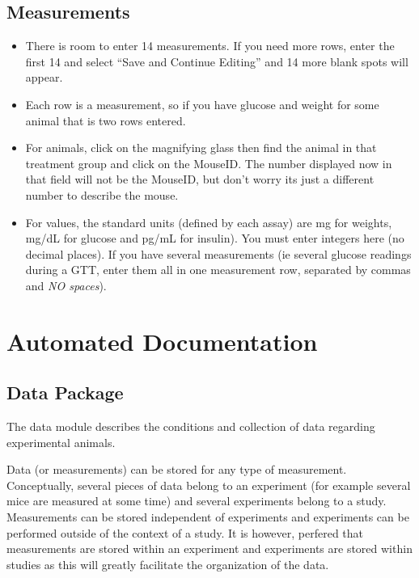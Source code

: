 \documentclass[letterpaper,10pt,english]{sphinxmanual}
\begin{document}
\section{Measurements}
\label{usage:measurements}\begin{itemize}
\item {} 
There is room to enter 14 measurements.  If you need more rows, enter the first 14 and select ``Save and Continue Editing'' and 14 more blank spots will appear.


\item {} 
Each row is a measurement, so if you have glucose and weight for some animal that is two rows entered.


\item {} 
For animals, click on the magnifying glass then find the animal in that treatment group and click on the MouseID. The number displayed now in that field will not be the MouseID, but don't worry its just a different number to describe the mouse.


\item {} 
For values, the standard units (defined by each assay) are mg for weights, mg/dL for glucose and pg/mL for insulin).  You must enter integers here (no decimal places).  If you have several measurements (ie several glucose readings during a GTT, enter them all in one measurement row, separated by commas and \emph{NO spaces}).


\end{itemize}


\chapter{Automated Documentation}
\label{api:automated-documentation}\label{api::doc}

\section{Data Package}
\label{api:data-package}\label{api:module-data}
The data module describes the conditions and collection of data regarding experimental animals.


Data (or measurements) can be stored for any type of measurement.  Conceptually, several pieces of data belong to an experiment (for example several mice are measured at some time) and several experiments belong to a study.  Measurements can be stored independent of experiments and experiments can be performed outside of the context of a study.  It is however, perfered that measurements are stored within an experiment and experiments are stored within studies as this will greatly facilitate the organization of the data.
\end{document}
